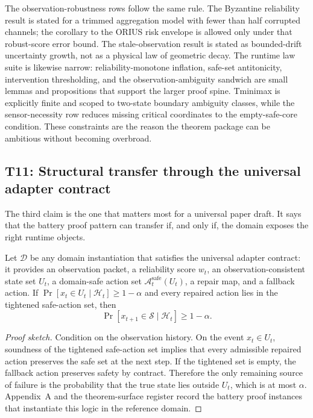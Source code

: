 The observation-robustness rows follow the same rule.  The Byzantine reliability result
is stated for a trimmed aggregation model with fewer than half corrupted channels; the
corollary to the ORIUS risk envelope is allowed only under that robust-score error
bound.  The stale-observation result is stated as bounded-drift uncertainty growth, not
as a physical law of geometric decay.  The runtime law suite is likewise narrow:
reliability-monotone inflation, safe-set antitonicity, intervention thresholding, and
the observation-ambiguity sandwich are small lemmas and propositions that support the
larger proof spine.  Tminimax is explicitly finite and scoped to two-state boundary
ambiguity classes, while the sensor-necessity row reduces missing critical coordinates
to the empty-safe-core condition.  These constraints are the reason the theorem package
can be ambitious without becoming overbroad.

\subsection{T11: Structural transfer through the universal adapter contract}
The third claim is the one that matters most for a universal paper draft.  It says that
the battery proof pattern can transfer if, and only if, the domain exposes the right
runtime objects.

\begin{theorem}
\label{thm:prof-t11}
Let \(\mathcal{D}\) be any domain instantiation that satisfies the universal adapter
contract: it provides an observation packet, a reliability score \(w_t\), an
observation-consistent state set \(U_t\), a domain-safe action set
\(\mathcal{A}_t^{\mathrm{safe}}(U_t)\), a repair map, and a fallback action.  If
\(\Pr[x_t\in U_t\mid\mathcal{H}_t]\ge 1-\alpha\) and every repaired action lies in the
tightened safe-action set, then
\[
  \Pr[x_{t+1}\in\mathcal{S}\mid\mathcal{H}_t]\ge 1-\alpha.
\]
\end{theorem}

\begin{proof}[Proof sketch]
Condition on the observation history.  On the event \(x_t\in U_t\), soundness of the
tightened safe-action set implies that every admissible repaired action preserves the
safe set at the next step.  If the tightened set is empty, the fallback action preserves
safety by contract.  Therefore the only remaining source of failure is the probability
that the true state lies outside \(U_t\), which is at most \(\alpha\).  Appendix~A and
the theorem-surface register record the battery proof instances that instantiate this
logic in the reference domain.
\end{proof}


